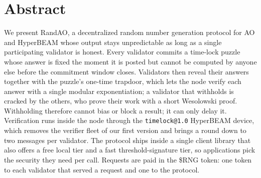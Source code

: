 \section*{Abstract}
We present RandAO, a decentralized random number generation protocol for AO and HyperBEAM whose output stays unpredictable as long as a single participating validator is honest. Every validator commits a time-lock puzzle whose answer is fixed the moment it is posted but cannot be computed by anyone else before the commitment window closes. Validators then reveal their answers together with the puzzle's one-time trapdoor, which lets the node verify each answer with a single modular exponentiation; a validator that withholds is cracked by the others, who prove their work with a short Wesolowski proof. Withholding therefore cannot bias or block a result; it can only delay it. Verification runs inside the node through the \texttt{timelock@1.0} HyperBEAM device, which removes the verifier fleet of our first version and brings a round down to two messages per validator. The protocol ships inside a single client library that also offers a free local tier and a fast threshold-signature tier, so applications pick the security they need per call. Requests are paid in the \$RNG token: one token to each validator that served a request and one to the protocol.
